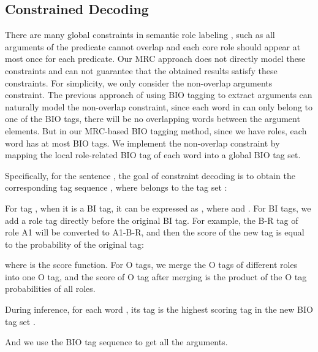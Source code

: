 \documentclass[11pt]{article}
\begin{document}
\subsection{Constrained Decoding}
\label{sec:decode}
There are many global constraints in semantic role labeling \cite{punyakanok2008importance,li2020structured}, such as all arguments of the predicate cannot overlap and each core role should appear at most once for each predicate. Our MRC approach does not directly model these constraints and can not guarantee that the obtained results satisfy these constraints. For simplicity, we only consider the non-overlap arguments constraint. The previous approach of using BIO tagging \cite{he2017deep, shi2019simple} to extract arguments can naturally model the non-overlap constraint, since each word in  can only belong to one of the BIO tags, there will be no overlapping words between the argument elements. But in 
our MRC-based BIO tagging method, since we have  roles, each word has at most  BIO tags.
We implement the non-overlap constraint by mapping the local role-related BIO tag of each word into a global BIO tag set. 
\par
Specifically, for the sentence , the goal of constraint decoding is to obtain the corresponding tag sequence , where  belongs to the tag set :

For tag , when it is a BI tag, it can be expressed as , where  and . For BI tags, we add a role tag directly before the original BI tag. For example, the B-R tag of role A1 will be converted to A1-B-R, and then the score of the new tag is equal to the probability of the original tag:

where  is the score function. For O tags, we merge the O tags of different roles into one O tag, and the score of O tag after merging is the product of the O tag probabilities of all roles. 

During inference, for each word , its tag  is the highest scoring tag in the new BIO tag set .

And we use the BIO tag sequence  to get all the arguments.
\end{document}
